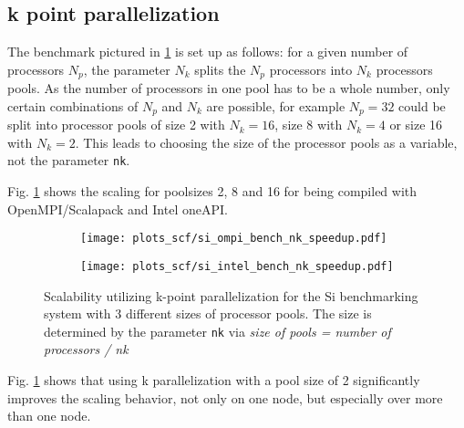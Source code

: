 \documentclass[main.tex]{subfiles}
\begin{document}
\subsection{k point parallelization}\label{sub:scf_scaling_k_point}

The benchmark pictured in \ref{fig:scaling_scf_nk_si} is set up as follows: for a given number of processors \(N_p\), the parameter \(N_k\) splits the \(N_p\) processors into \(N_k\) processors pools.
As the number of processors in one pool has to be a whole number, only certain combinations of \(N_p\) and \(N_k\) are possible, for example \(N_p = 32\) could be split into processor pools of size 2 with \(N_k = 16\), size 8 with \(N_k = 4\) or size 16 with \(N_k = 2\).
This leads to choosing the size of the processor pools as a variable, not the parameter \texttt{nk}.

Fig. \ref{fig:scaling_scf_nk_si} shows the scaling for poolsizes 2, 8 and 16 for \QE being compiled with OpenMPI/Scalapack and Intel oneAPI.

\begin{figure}[ht!]
\begin{subfigure}[b]{0.49\textwidth}
    \centering
    \texttt{[image: plots\_scf/si\_ompi\_bench\_nk\_speedup.pdf]}
\end{subfigure}
\begin{subfigure}[b]{0.49\textwidth}
    \centering
    \texttt{[image: plots\_scf/si\_intel\_bench\_nk\_speedup.pdf]}
\end{subfigure}
\caption{Scalability utilizing k-point parallelization for the Si benchmarking system with 3 different sizes of processor pools. The size is determined by the parameter \texttt{nk} via \emph{size of pools = number of processors / nk}}
\label{fig:scaling_scf_nk_si}
\end{figure}

Fig. \ref{fig:scaling_scf_nk_si} shows that using k parallelization with a pool size of 2 significantly improves the scaling behavior, not only on one node, but especially over more than one node.


\end{document}
